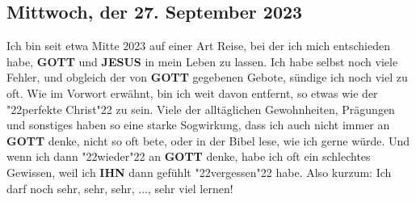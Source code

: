 \documentclass[12pt,a4paper]{article}
\newcommand{\Gott}[0]{\textbf{GOTT}}
\newcommand{\Ihn}[0]{\textbf{IHN}}
\newcommand{\Jesus}[0]{\textbf{JESUS}}
\newcommand{\q}[1]{\char"22{#1}\char"22 }
\begin{document}
	\subsection{Mittwoch, der 27. September 2023}
		Ich bin seit etwa Mitte 2023 auf einer Art Reise,
		bei der ich mich entschieden habe,
		{\Gott} und {\Jesus} in mein Leben zu lassen.
		Ich habe selbst noch viele Fehler,
		und obgleich der von {\Gott} gegebenen Gebote,
		s\"undige ich noch viel zu oft.
		Wie im Vorwort erw\"ahnt,
		bin ich weit davon entfernt,
		so etwas wie der \q{perfekte Christ} zu sein.
		Viele der allt\"aglichen Gewohnheiten,
		Pr\"agungen und sonstiges haben so eine starke Sogwirkung,
		dass ich auch nicht immer an {\Gott} denke,
		nicht so oft bete,
		oder in der Bibel lese,
		wie ich gerne w\"urde.
		Und wenn ich dann \q{wieder} an {\Gott} denke,
		habe ich oft ein schlechtes Gewissen,
		weil ich {\Ihn} dann gef\"uhlt \q{vergessen} habe.
		Also kurzum:
		Ich darf noch sehr, sehr, sehr, ..., sehr viel lernen!
\end{document}
